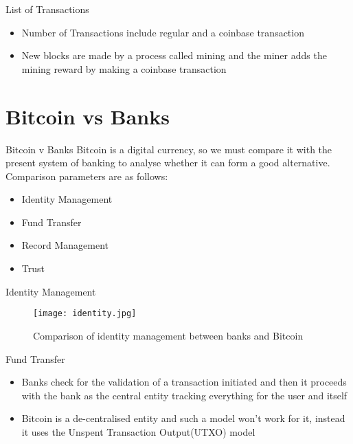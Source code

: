\documentclass{beamer}
\begin{document}
\begin{frame}{List of Transactions}
\begin{itemize}
    \item Number of Transactions include regular and a coinbase transaction
    \item New blocks are made by a process called mining and the miner adds the mining reward by making a coinbase transaction
\end{itemize}


\end{frame}
\section{Bitcoin vs Banks }
\begin{frame}{Bitcoin v Banks}
Bitcoin is a digital currency, so we must compare it with the present system of banking to analyse whether it can form a good alternative. Comparison parameters are as follows:
\begin{itemize}
    \item Identity Management
    \item Fund Transfer
    \item Record Management
    \item Trust
\end{itemize}
 
\end{frame}
\begin{frame}{Identity Management}
\begin{figure}[H]\centering 
\texttt{[image: identity.jpg]}
\caption{Comparison of identity management between banks and Bitcoin}
\end{figure}
\end{frame}
\begin{frame}{Fund Transfer}
    \begin{itemize}
        \item Banks check for the validation of a transaction initiated and then it proceeds with the bank as the central entity tracking everything for the user and itself
        \item Bitcoin is a de-centralised entity and such a model won't work for it, instead it uses the Unspent Transaction Output(UTXO) model
    \end{itemize}
\end{frame}
\end{document}
